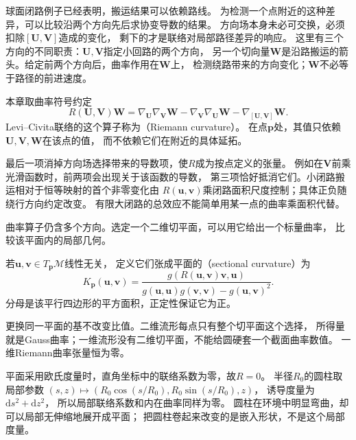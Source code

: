 球面闭路例子已经表明，搬运结果可以依赖路线。
为检测一个点附近的这种差异，可以比较沿两个方向先后求协变导数的结果。
方向场本身未必可交换，必须扣除$[\bm U,\bm V]$造成的变化，
剩下的才是联络对局部路径差异的响应。
这里有三个方向的不同职责：$\bm U,\bm V$指定小回路的两个方向，
另一个切向量$\bm W$是沿路搬运的箭头。给定前两个方向后，曲率作用在$\bm W$上，
检测绕路带来的方向变化；$\bm W$不必等于路径的前进速度。

\begin{definition}[Riemann曲率]
\label{def:geometry-riemann-curvature}
本章取曲率符号约定
\begin{equation}
 R(\bm U,\bm V)\bm W
 =\nabla_{\bm U}\nabla_{\bm V}\bm W
  -\nabla_{\bm V}\nabla_{\bm U}\bm W
  -\nabla_{[\bm U,\bm V]}\bm W.
 \label{eq:geometry-riemann-curvature}
\end{equation}
Levi--Civita联络的这个算子称为（Riemann curvature）。
在点$\bm p$处，其值只依赖$\bm U,\bm V,\bm W$在该点的值，
而不依赖它们在附近的具体延拓。
\end{definition}
最后一项消掉方向场选择带来的导数项，使$R$成为按点定义的张量。
例如在$\bm V$前乘光滑函数时，前两项会出现关于该函数的导数，
第三项恰好抵消它们。小闭路搬运相对于恒等映射的首个非零变化由
$R(\bm u,\bm v)$乘闭路面积尺度控制；具体正负随绕行方向约定改变。
有限大闭路的总效应不能简单用某一点的曲率乘面积代替。

曲率算子仍含多个方向。选定一个二维切平面，可以用它给出一个标量曲率，
比较该平面内的局部几何。
\begin{definition}[截面曲率]
\label{def:geometry-sectional-curvature}
若$\bm u,\bm v\in T_{\bm p}\mathcal M$线性无关，
定义它们张成平面的（sectional curvature）为
\begin{equation}
 K_{\bm p}(\bm u,\bm v)
 =\frac{g(R(\bm u,\bm v)\bm v,\bm u)}
 {g(\bm u,\bm u)g(\bm v,\bm v)-g(\bm u,\bm v)^2}.
 \label{eq:geometry-sectional-curvature}
\end{equation}
分母是该平行四边形的平方面积，正定性保证它为正。
\end{definition}
更换同一平面的基不改变比值。二维流形每点只有整个切平面这个选择，
所得量就是Gauss曲率；一维流形没有二维切平面，不能给圆硬套一个截面曲率数值。
一维Riemann曲率张量恒为零。

平面采用欧氏度量时，直角坐标中的联络系数为零，故$R=0$。
半径$R_0$的圆柱取局部参数
$(s,z)\mapsto(R_0\cos(s/R_0),R_0\sin(s/R_0),z)$，
诱导度量为$\mathrm ds^2+\mathrm dz^2$，
所以局部联络系数和内在曲率同样为零。
圆柱在环境中明显弯曲，却可以局部无伸缩地展开成平面；
把圆柱卷起来改变的是嵌入形状，不是这个局部度量。

